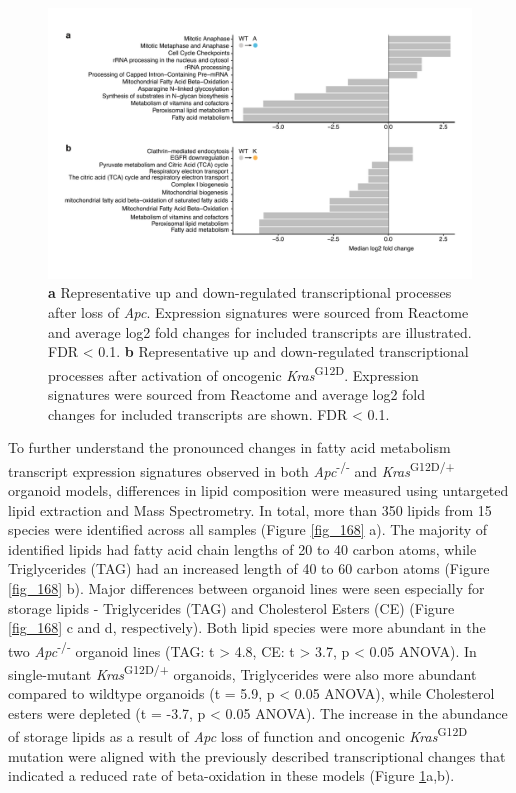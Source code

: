 \begin{flushleft}
\begin{figure}[H]
\centering
\includegraphics[width=\textwidth,
                height=\textheight,
                keepaspectratio]{figures/adenomaprofiling/pdf/fig_1_6_2.pdf}
\caption[Representative up and down-regulated transcriptional processes after loss of \textit{Apc} and activation of oncogenic \textit{Kras}\textsuperscript{G12D}]{
\textbf{a} Representative up and down-regulated transcriptional processes after loss of \textit{Apc}. Expression signatures were sourced from Reactome and average log2 fold changes for included transcripts are illustrated. FDR < 0.1.
\textbf{b} Representative up and down-regulated transcriptional processes after activation of oncogenic \textit{Kras}\textsuperscript{G12D}. Expression signatures were sourced from Reactome and average log2 fold changes for included transcripts are shown. FDR < 0.1.
}
\label{fig_162}
\end{figure}
\bigbreak

To further understand the pronounced changes in fatty acid metabolism transcript expression signatures observed in both \textit{Apc}\textsuperscript{-/-}  and \textit{Kras}\textsuperscript{G12D/+} organoid models, differences in lipid composition were measured using untargeted lipid extraction and Mass Spectrometry. In total, more than 350 lipids from 15 species were identified across all samples (Figure \ref{fig_168} a). The majority of identified lipids had fatty acid chain lengths of 20 to 40 carbon atoms, while Triglycerides (TAG) had an increased length of 40 to 60 carbon atoms (Figure \ref{fig_168} b). Major differences between organoid lines were seen especially for storage lipids - Triglycerides (TAG) and Cholesterol Esters (CE) (Figure \ref{fig_168} c and d, respectively). Both lipid species were more abundant in the two \textit{Apc}\textsuperscript{-/-}  organoid lines (TAG: t > 4.8, CE: t > 3.7, p < 0.05 ANOVA). In single-mutant \textit{Kras}\textsuperscript{G12D/+} organoids, Triglycerides were also more abundant compared to wildtype organoids (t = 5.9, p < 0.05 ANOVA), while Cholesterol esters were depleted (t = -3.7, p < 0.05 ANOVA). The increase in the abundance of storage lipids as a result of \textit{Apc} loss of function and oncogenic \textit{Kras}\textsuperscript{G12D} mutation were aligned with the previously described transcriptional changes that indicated a reduced rate of beta-oxidation in these models (Figure \ref{fig_162}a,b). 


\end{flushleft}
